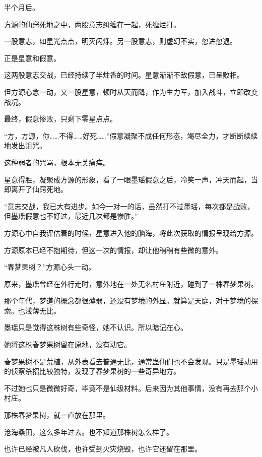 
\begin{this_body}

半个月后。

方源的仙窍死地之中，两股意志纠缠在一起，死缠烂打。

一股意志，如星光点点，明灭闪烁。另一股意志，则虚幻不实，忽进忽退。

正是星意和假意。

这两股意志交战，已经持续了半炷香的时间。星意渐渐不敌假意，已呈败相。

但方源心念一动，又一股星意，顿时从天而降，作为生力军，加入战斗，立即改变战况。

最终，假意惨败，只剩下零星点点。

“方，方源，你……不得……好死……”假意凝聚不成任何形态，竭尽全力，才断断续续地发出诅咒。

这种弱者的咒骂，根本无关痛痒。

星意得胜，凝聚成方源的形象，看了一眼墨瑶假意之后，冷笑一声，冲天而起，当即离开了仙窍死地。

“意志交战，我已大有进步。如今一对一的话，虽然打不过墨瑶，每次都是战败，但墨瑶假意也不好过，最近几次都是惨胜。”

方源心中自我评估着的时候，星意进入他的脑海，将此次获取的情报呈现给方源。

方源原本已经不抱期待，但这一次的情报，却让他稍稍有些微的意外。

“春梦果树？”方源心头一动。

原来，墨瑶曾经在外行走时，意外地在一处无名村庄附近，碰到了一株春梦果树。

那个年代，梦道的概念都很薄弱，还没有梦境的外显。就算是天庭，对于梦境的探索。也浅薄无比。

墨瑶只是觉得这株树有些奇怪，她不认识。所以暗记在心。

她将这株春梦果树留在原地，没有动它。

春梦果树不是荒植，从外表看去普通无比，通常蛊仙们也不会发现。只是墨瑶动用的侦察杀招比较独特，发现了春梦果树的一些奇异地方。

不过她也只是微微好奇，毕竟不是仙级材料。后来因为其他事情，没有再去那个小村庄。

那株春梦果树，就一直放在那里。

沧海桑田，这么多年过去。也不知道那株树怎么样了。

也许已经被凡人砍伐，也许受到火灾烧毁，也许它还留在那里。


\end{this_body}
